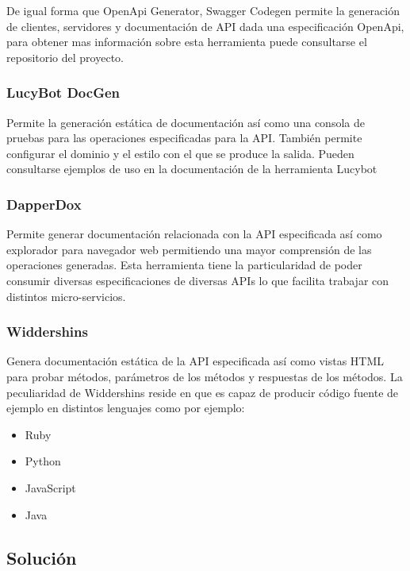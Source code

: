 \documentclass{svproc}
\begin{document}
De igual forma que OpenApi Generator, Swagger Codegen permite la generación de clientes, servidores y documentación de API dada una especificación OpenApi, para obtener mas información sobre esta herramienta puede consultarse el repositorio del proyecto.\cite{swagger}

\subsubsection{LucyBot DocGen}

Permite la generación estática de documentación así como una consola de pruebas para las operaciones especificadas para la API. También permite configurar el dominio y el estilo con el que se produce la salida. Pueden consultarse ejemplos de uso en la documentación de la herramienta Lucybot\cite{lucy}

\subsubsection{DapperDox}

Permite generar documentación relacionada con la API especificada así como explorador para navegador web permitiendo una mayor comprensión de las operaciones generadas. Esta herramienta tiene la particularidad de poder consumir diversas especificaciones de diversas APIs lo que facilita trabajar con distintos micro-servicios.  

\subsubsection{Widdershins}

Genera documentación estática de la API especificada así como vistas HTML para probar métodos, parámetros de los métodos y respuestas de los métodos. La peculiaridad de Widdershins\cite{widdershins} reside en que es capaz de producir código fuente de ejemplo en distintos lenguajes como por ejemplo:

\begin{itemize}
\item Ruby
\item Python
\item JavaScript
\item Java
\end{itemize} 


\subsection{Solución}
\end{document}
